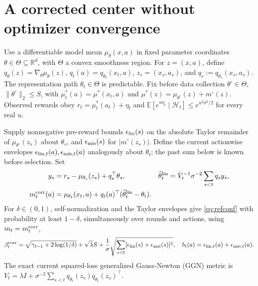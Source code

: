\documentclass[10pt]{article}
\theoremstyle{definition}
\newcommand{\Vbar}{\bar V}
\newcommand{\R}{\mathbb R}
\begin{document}
\section{A corrected center without optimizer convergence}
Use a differentiable model mean $\mu_\theta(x,a)$ in fixed parameter coordinates $\theta\in\Theta\subseteq\R^d$, with $\Theta$ a convex smoothness region. For $z=(x,a)$, define $q_\theta(z)=\nabla_\theta\mu_\theta(z)$, $q_t(a)=q_{\theta_t}(x_t,a)$, $z_s=(x_s,a_s)$, and $q_s:=q_{\theta_s}(x_s,a_s)$. The representation path $\theta_t\in\Theta$ is predictable. Fix before data collection $\theta^\circ\in\Theta$, $\|\theta^\circ\|_2\le S$, with $\mu_t^*(a)=\mu^*(x_t,a)$ and $\mu^*(z)=\mu_{\theta^\circ}(z)+m^\circ(z)$. Observed rewards obey $r_t=\mu_t^*(a_t)+\eta_t$ and $\mathbb E[e^{u\eta_t}\mid\mathcal H_t]\le e^{u^2\sigma^2/2}$ for every real $u$.

Supply nonnegative pre-reward bounds $\epsilon_{\rm lin}(s)$ on the absolute Taylor remainder of $\mu_{\theta^\circ}(z_s)$ about $\theta_s$, and $\epsilon_{\rm mis}(s)$ for $|m^\circ(z_s)|$. Define the current actionwise envelopes $\epsilon_{{\rm lin},t}(a),\epsilon_{{\rm mis},t}(a)$ analogously about $\theta_t$; the past sum below is known before selection. Set
\begin{align}
y_s&=r_s-\mu_{\theta_s}(z_s)+q_s^\top\theta_s, &
\widehat\theta_t^{\rm lin}&=\Vbar_t^{-1}\sigma^{-2}\sum_{s<t}q_sy_s, \\
m_t^{\rm corr}(a)&=\mu_{\theta_t}(x_t,a)+q_t(a)^\top(\widehat\theta_t^{\rm lin}-\theta_t).&&
\label{eq:center}
\end{align}
For $\delta\in(0,1)$, self-normalization \cite{abbasi2011improved} and the Taylor envelopes give \eqref{eq:refconf} with probability at least $1-\delta$, simultaneously over rounds and actions, using $m_t=m_t^{\rm corr}$,
\begin{equation}
\beta_t^{\rm corr}=\sqrt{\gamma_{t-1}+2\log(1/\delta)}+\sqrt{\lambda}S
+\frac1\sigma\sqrt{\sum_{s<t}[\epsilon_{\rm lin}(s)+\epsilon_{\rm mis}(s)]^2},
\quad b_t(a)=\epsilon_{{\rm lin},t}(a)+\epsilon_{{\rm mis},t}(a).
\label{eq:beta}
\end{equation}
The exact current squared-loss generalized Gauss-Newton (GGN) metric is $V_t=\lambda I+\sigma^{-2}\sum_{s<t}q_{\theta_t}(z_s)q_{\theta_t}(z_s)^\top$.
\end{document}
